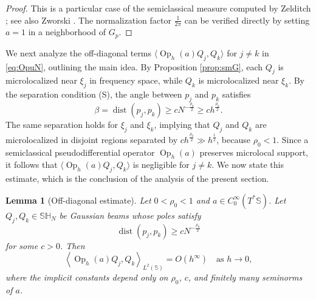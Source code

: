 \documentclass[12pt,reqno]{amsart}
\DeclareMathOperator{\dist}{dist}
\DeclareMathOperator{\Op}{Op}
\newcommand{\Sb}{\mathbb{S}}
\newcommand{\SH}{\mathbb{SH}}
\theoremstyle{plain}
\newtheorem{lemma}[thm]{Lemma}
\theoremstyle{definition}
\theoremstyle{remark}
\numberwithin{equation}{section}
\begin{document}
\begin{proof}
This is a particular case of the semiclassical measure computed by Zelditch \cite[Proposition 12.1]{Ze3}; see also Zworski \cite[Example 2 in Section 5.1]{Zw}. The normalization factor $\frac{1}{2\pi}$ can be verified directly by setting $a=1$ in a neighborhood of $G_p$.
\end{proof}

We next analyze the off-diagonal terms $\langle\Op_h(a)Q_j,Q_k\rangle$ for $j\ne k$ in \eqref{eq:OpuN}, outlining the main idea. By Proposition \ref{prop:smG}, each $Q_j$ is microlocalized near $\xi_j$ in frequency space, while $Q_k$ is microlocalized near $\xi_k$. By the separation condition (S), the angle between $p_j$ and $p_k$ satisfies
$$\beta=\dist\left(p_j,p_k\right)\ge cN^{-\frac{\rho_0}{2}}\ge ch^{\frac{\rho_0}{2}}.$$
The same separation holds for $\xi_j$ and $\xi_k$, implying that $Q_j$ and $Q_k$ are microlocalized in  disjoint regions separated by $ch^{\frac{\rho_0}{2}}\gg h^\frac12$, because $\rho_0<1$. Since a semiclassical pseudodifferential operator $\Op_h(a)$ preserves microlocal support, it follows that $\langle\Op_h(a)Q_j,Q_k\rangle$ is negligible for $j\ne k$. We now state this estimate, which is the conclusion of the analysis of the present section.

\begin{lemma}[Off-diagonal estimate]\label{lemma:off}
Let $0<\rho_0<1$ and $a\in C_0^\infty(T^*\Sb)$. Let $Q_j,Q_k\in\SH_N$ be Gaussian beams whose poles satisfy
$$\dist\left(p_j,p_k\right)\ge cN^{-\frac{\rho_0}{2}}$$
for some $c>0$. Then
$$\left\langle\Op_h(a)Q_j,Q_k\right\rangle_{L^2(\Sb)}=O\left(h^\infty\right)\quad\text{as }h\to0,$$
where the implicit constants depend only on $\rho_0$, $c$, and finitely many seminorms of $a$.
\end{lemma}
\end{document}
